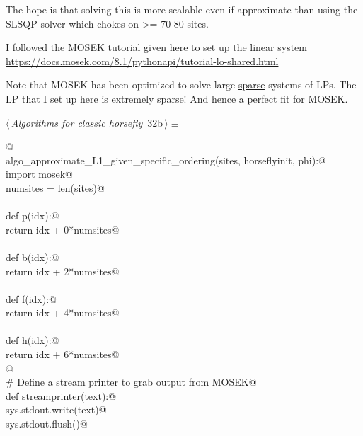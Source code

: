 \documentclass[11.5pt]{report}
\begin{document}
The hope is that solving this is more scalable even if approximate
than using the SLSQP solver which chokes on >= 70-80 sites. 
    
I followed the MOSEK tutorial given here to set up the linear system
\url{https://docs.mosek.com/8.1/pythonapi/tutorial-lo-shared.html}
    
Note that MOSEK has been optimized to solve large \underline{sparse} systems of LPs. 
The LP that I set up here is extremely sparse! And hence a perfect fit 
for MOSEK. 


\begin{flushleft} \small\label{scrap46}\raggedright\small
{} $\langle\,${\itshape Algorithms for classic horsefly}\nobreak\ {\footnotesize {32b}}$\,\rangle\equiv$
\vspace{-1ex}
\begin{list}{}{} \item
\mbox{}\verb@ @\\
\mbox{}\verb@def  algo_approximate_L1_given_specific_ordering(sites, horseflyinit, phi):@\\
\mbox{}\verb@    import mosek@\\
\mbox{}\verb@    numsites = len(sites)@\\
\mbox{}\verb@@\\
\mbox{}\verb@    def p(idx):@\\
\mbox{}\verb@        return idx + 0*numsites@\\
\mbox{}\verb@@\\
\mbox{}\verb@    def b(idx):@\\
\mbox{}\verb@        return idx + 2*numsites@\\
\mbox{}\verb@@\\
\mbox{}\verb@    def f(idx):@\\
\mbox{}\verb@        return idx + 4*numsites@\\
\mbox{}\verb@@\\
\mbox{}\verb@    def h(idx):@\\
\mbox{}\verb@        return idx + 6*numsites@\\
\mbox{}\verb@    @\\
\mbox{}\verb@    # Define a stream printer to grab output from MOSEK@\\
\mbox{}\verb@    def streamprinter(text):@\\
\mbox{}\verb@        sys.stdout.write(text)@\\
\mbox{}\verb@        sys.stdout.flush()@\\

\end{list}
\end{flushleft}
\end{document}
